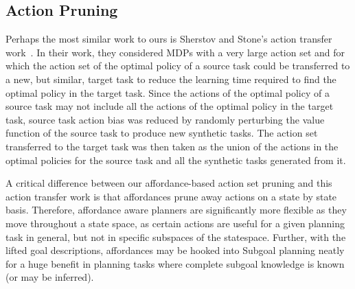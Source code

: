 \documentclass[]{article}
\newcommand{\jmnote}[1]{\textcolor{Green}{\textbf{JM: #1}}}
\newcommand{\dgnote}[1]{\textcolor{Orange}{\textbf{DG: #1}}}
\begin{document}
\subsection{Action Pruning}


Perhaps the most similar work to ours is Sherstov and Stone's action transfer work~\cite{sherstov2005improving}.
In their work, they considered MDPs with a very large action set and for which the action
set of the optimal policy of a source task could be transferred to a new, but similar, target
task to reduce the learning time required to find the optimal policy in the target task. Since the actions
of the optimal policy of a source task may not include all the actions of the optimal policy
in the target task, source task action bias was reduced by randomly perturbing the value function
of the source task to produce new synthetic tasks. The action set transferred to the target task
was then taken as the union of the actions in the optimal policies for the source task and all the
synthetic tasks generated from it.

A critical difference between our affordance-based action set pruning and this action transfer
work is that affordances prune away actions on a state by state basis. Therefore, affordance aware
planners are significantly more flexible as they move throughout a state space, as certain actions
are useful for a given planning task in general, but not in specific subspaces of the statespace. Further,
with the lifted goal descriptions, affordances may be hooked into Subgoal planning neatly for a huge
benefit in planning tasks where complete subgoal knowledge is known (or may be inferred).
%
\end{document}
